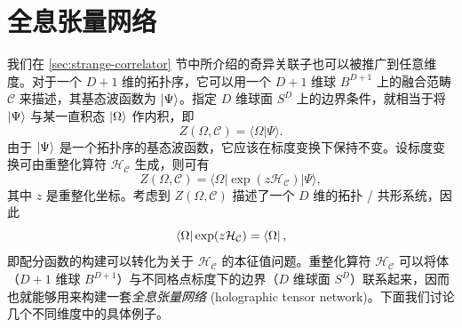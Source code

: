 \section{全息张量网络}
\label{sec:holographic-tensor-network}


我们在 \ref{sec:strange-correlator} 节中所介绍的奇异关联子也可以被推广到任意维度。对于一个 $D+1$ 维的拓扑序，它可以用一个 $D+1$ 维球 $B^{D+1}$ 上的融合范畴 $\mathcal{C}$ 来描述，其基态波函数为 $\ket{\Psi}$。指定 $D$ 维球面 $S^D$ 上的边界条件，就相当于将 $\ket{\Psi}$ 与某一直积态 $\ket{\Omega}$ 作内积，即
\begin{equation}
  Z(\Omega, \mathcal{C}) = \langle \Omega|\Psi \rangle.
\end{equation}
由于 $\ket{\Psi}$ 是一个拓扑序的基态波函数，它应该在标度变换下保持不变。设标度变换可由重整化算符 $\mathcal{H}_{\mathcal{C}}$ 生成，则可有
\begin{equation}
  Z(\Omega, \mathcal{C}) = \langle \Omega | \exp(z\mathcal{H}_{\mathcal{C}}) | \Psi \rangle,
\end{equation}
其中 $z$ 是重整化坐标。考虑到 $Z(\Omega, \mathcal{C})$ 描述了一个 $D$ 维的拓扑 / 共形系统，因此
\begin{equation}
  \bra{\Omega} \exp(z\mathcal{H}_{\mathcal{C}}) = \bra{\Omega},
  \label{eq:rg-operator}
\end{equation}
即配分函数的构建可以转化为关于 $\mathcal{H}_{\mathcal{C}}$ 的本征值问题。重整化算符 $\mathcal{H}_{\mathcal{C}}$ 可以将体（$D+1$ 维球 $B^{D+1}$）与不同格点标度下的边界（$D$ 维球面 $S^D$）联系起来，因而也就能够用来构建一套\emph{全息张量网络} (holographic tensor network)。下面我们讨论几个不同维度中的具体例子。

